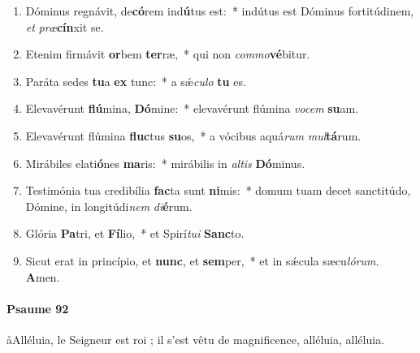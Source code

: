 \documentclass[twoside]{article}
\begin{document}
\begin{paracol}[1]{2}

\begin{enumerate}[wide, itemsep=0mm, labelwidth=!, labelindent=0pt, label=\color{gregoriocolor}\theenumi]
\item Dóminus regnávit, de\textbf{có}rem ind\textbf{ú}tus est:~* indútus est Dóminus fortitúdinem, \textit{et} \textit{præ}\textbf{cín}xit se.

\item Etenim firmávit \textbf{or}bem \textbf{ter}ræ,~* qui non \textit{com}\textit{mo}\textbf{vé}bitur.

\item Paráta sedes \textbf{tu}a \textbf{ex} tunc:~* a sǽ\textit{cu}\textit{lo} \textbf{tu} es.

\item Elevavérunt \textbf{flú}mina, \textbf{Dó}mine:~* elevavérunt flúmina \textit{vo}\textit{cem} \textbf{su}am.

\item Elevavérunt flúmina \textbf{fluc}tus \textbf{su}os,~* a vócibus aquá\textit{rum} \textit{mul}\textbf{tá}rum.

\item Mirábiles elati\textbf{ó}nes \textbf{ma}ris:~* mirábilis in \textit{al}\textit{tis} \textbf{Dó}minus.

\item Testimónia tua credibília \textbf{fac}ta sunt \textbf{ni}mis:~* domum tuam decet sanctitúdo, Dómine, in longitúdi\textit{nem} \textit{di}\textbf{é}rum.

\item Glória \textbf{Pa}tri, et \textbf{Fí}lio,~* et Spirí\textit{tu}\textit{i} \textbf{Sanc}to.

\item Sicut erat in princípio, et \textbf{nunc}, et \textbf{sem}per,~* et in sǽcula sæcu\textit{ló}\textit{rum}. \textbf{A}men.
\end{enumerate}

\switchcolumn


\paragraph{Psaume 92}
\aa Alléluia, le Seigneur est roi ; il s'est vêtu de magnificence, alléluia, alléluia.


\begin{enumerate}[wide, itemsep=0mm, labelwidth=!, labelindent=0pt, label=\color{gregoriocolor}\theenumi]


\end{enumerate}
\end{paracol}
\end{document}
